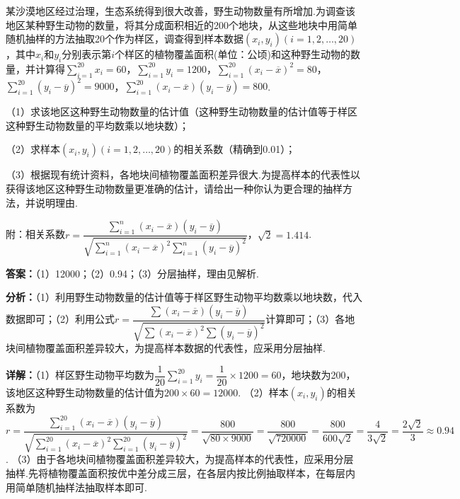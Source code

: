 \begin{question}[points=12]
某沙漠地区经过治理，生态系统得到很大改善，野生动物数量有所增加.为调查该地区某种野生动物的数量，将其分成面积相近的200个地块，从这些地块中用简单随机抽样的方法抽取20个作为样区，调查得到样本数据$(x_i,y_i)(i=1,2,\ldots,20)$，其中$x_i$和$y_i$分别表示第$i$个样区的植物覆盖面积(单位：公顷)和这种野生动物的数量，并计算得$\sum\limits_{i=1}^{20}x_i=60$，$\sum\limits_{i=1}^{20}y_i=1200$，$\sum\limits_{i=1}^{20}(x_i-\overline{x})^2=80$，$\sum\limits_{i=1}^{20}(y_i-\overline{y})^2=9000$，$\sum\limits_{i=1}^{20}(x_i-\overline{x})(y_i-\overline{y})=800$.

（1）求该地区这种野生动物数量的估计值（这种野生动物数量的估计值等于样区这种野生动物数量的平均数乘以地块数）；

（2）求样本$(x_i,y_i)(i=1,2,\ldots,20)$的相关系数（精确到0.01）；

（3）根据现有统计资料，各地块间植物覆盖面积差异很大.为提高样本的代表性以获得该地区这种野生动物数量更准确的估计，请给出一种你认为更合理的抽样方法，并说明理由.

附：相关系数$r=\dfrac{\sum\limits_{i=1}^{n}(x_i-\overline{x})(y_i-\overline{y})}{\sqrt{\sum\limits_{i=1}^{n}(x_i-\overline{x})^2\sum\limits_{i=1}^{n}(y_i-\overline{y})^2}}$，$\sqrt2=1.414$.
\begin{solution}
\textbf{答案：}（1）12000；（2）0.94；（3）分层抽样，理由见解析.

\textbf{分析：}（1）利用野生动物数量的估计值等于样区野生动物平均数乘以地块数，代入数据即可；（2）利用公式$r=\dfrac{\sum(x_i-\overline{x})(y_i-\overline{y})}{\sqrt{\sum(x_i-\overline{x})^2\sum(y_i-\overline{y})^2}}$计算即可；（3）各地块间植物覆盖面积差异较大，为提高样本数据的代表性，应采用分层抽样.

\textbf{详解：}（1）样区野生动物平均数为$\dfrac1{20}\sum_{i=1}^{20}y_i=\dfrac{1}{20}\times1200=60$，地块数为200，该地区这种野生动物数量的估计值为$200\times60=12000$.
（2）样本$(x_i,y_i)$的相关系数为$r=\dfrac{\sum_{i=1}^{20}(x_i-\overline{x})(y_i-\overline{y})}{\sqrt{\sum_{i=1}^{20}(x_i-\overline{x})^2\sum_{i=1}^{20}(y_i-\overline{y})^2}}=\dfrac{800}{\sqrt{80\times9000}}=\dfrac{800}{\sqrt{720000}}=\dfrac{800}{600\sqrt2}=\dfrac{4}{3\sqrt2}=\dfrac{2\sqrt2}{3}\approx0.94$.
（3）由于各地块间植物覆盖面积差异较大，为提高样本的代表性，应采用分层抽样.先将植物覆盖面积按优中差分成三层，在各层内按比例抽取样本，在每层内用简单随机抽样法抽取样本即可.
\end{solution}
\end{question}


